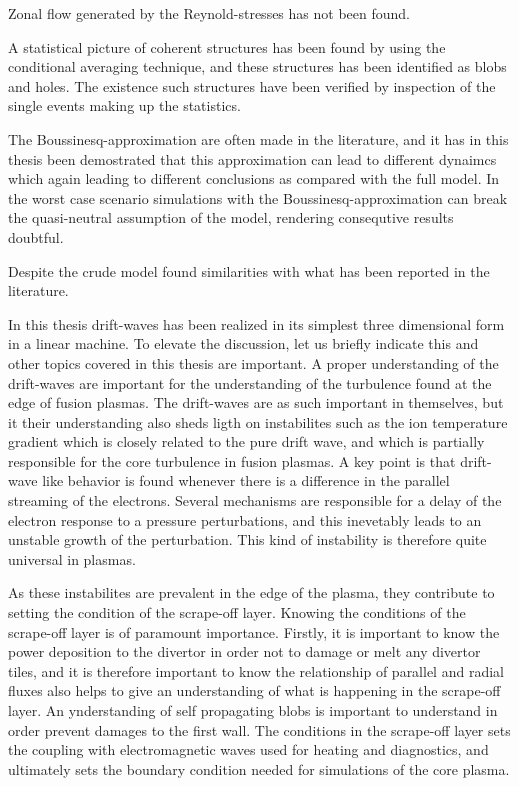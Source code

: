 Zonal flow generated by the Reynold-stresses has not been found.


A statistical picture of coherent structures has been found by using the conditional averaging technique, and these structures has been identified as blobs and holes.
The existence such structures have been verified by inspection of the single events making up the statistics.

The Boussinesq-approximation are often made in the literature, and it has in this thesis been demostrated that this approximation can lead to different dynaimcs which again leading to different conclusions as compared with the full model.
In the worst case scenario simulations with the Boussinesq-approximation can break the quasi-neutral assumption of the model, rendering consequtive results doubtful.

Despite the crude model found similarities with what has been reported in the literature.

In this thesis drift-waves has been realized in its simplest three dimensional form in a linear machine.
To elevate the discussion, let us briefly indicate this and other topics covered in this thesis are important.
A proper understanding of the drift-waves are important for the understanding of the turbulence found at the edge of fusion plasmas.
The drift-waves are as such important in themselves, but it their understanding also sheds ligth on instabilites such as the ion temperature gradient which is closely related to the pure drift wave, and which is partially responsible for the core turbulence in fusion plasmas.
A key point is that drift-wave like behavior is found whenever there is a difference in the parallel streaming of the electrons.
Several mechanisms are responsible for a delay of the electron response to a pressure perturbations, and this inevetably leads to an unstable growth of the perturbation.
This kind of instability is therefore quite universal in plasmas.

As these instabilites are prevalent in the edge of the plasma, they contribute to setting the condition of the scrape-off layer.
Knowing the conditions of the scrape-off layer is of paramount importance.
Firstly, it is important to know the power deposition to the divertor in order not to damage or melt any divertor tiles, and it is therefore important to know the relationship of parallel and radial fluxes also helps to give an understanding of what is happening in the scrape-off layer.
An ynderstanding of self propagating blobs is important to understand in order prevent damages to the first wall.
The conditions in the scrape-off layer sets the coupling with electromagnetic waves used for heating and diagnostics, and ultimately sets the boundary condition needed for simulations of the core plasma.

